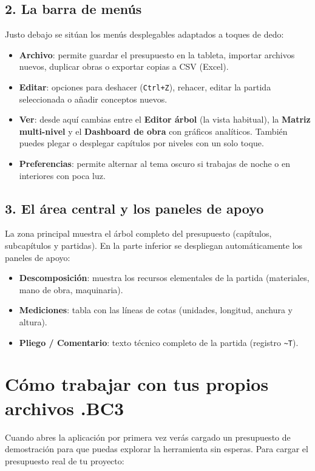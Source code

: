 \documentclass[11pt,a4paper]{article}
\begin{document}
\subsection{2. La barra de menús}
Justo debajo se sitúan los menús desplegables adaptados a toques de dedo:
\begin{itemize}[leftmargin=*]
    \item \textbf{Archivo}: permite guardar el presupuesto en la tableta, importar archivos nuevos, duplicar obras o exportar copias a CSV (Excel).
    \item \textbf{Editar}: opciones para deshacer (\texttt{Ctrl+Z}), rehacer, editar la partida seleccionada o añadir conceptos nuevos.
    \item \textbf{Ver}: desde aquí cambias entre el \textbf{Editor árbol} (la vista habitual), la \textbf{Matriz multi-nivel} y el \textbf{Dashboard de obra} con gráficos analíticos. También puedes plegar o desplegar capítulos por niveles con un solo toque.
    \item \textbf{Preferencias}: permite alternar al tema oscuro si trabajas de noche o en interiores con poca luz.
\end{itemize}

\subsection{3. El área central y los paneles de apoyo}
La zona principal muestra el árbol completo del presupuesto (capítulos, subcapítulos y partidas). En la parte inferior se despliegan automáticamente los paneles de apoyo:
\begin{itemize}[leftmargin=*]
    \item \textbf{Descomposición}: muestra los recursos elementales de la partida (materiales, mano de obra, maquinaria).
    \item \textbf{Mediciones}: tabla con las líneas de cotas (unidades, longitud, anchura y altura).
    \item \textbf{Pliego / Comentario}: texto técnico completo de la partida (registro \texttt{\textasciitilde T}).
\end{itemize}

\section{Cómo trabajar con tus propios archivos .BC3}

Cuando abres la aplicación por primera vez verás cargado un presupuesto de demostración para que puedas explorar la herramienta sin esperas. Para cargar el presupuesto real de tu proyecto:
\end{document}
